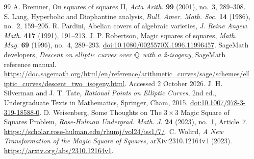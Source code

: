 \begin{thebibliography}{99}
 A. Bremner, On squares of squares II, \emph{Acta Arith.} \textbf{99} (2001), no.~3, 289--308.
 S. Lang, Hyperbolic and Diophantine analysis, \emph{Bull. Amer. Math. Soc.} \textbf{14} (1986), no.~2, 159--205.
 R. Pardini, Abelian covers of algebraic varieties, \emph{J. Reine Angew. Math.} \textbf{417} (1991), 191--213.
 J. P. Robertson, Magic squares of squares, \emph{Math. Mag.} \textbf{69} (1996), no.~4, 289--293. \href{https://doi.org/10.1080/0025570X.1996.11996457}{doi:10.1080/0025570X.1996.11996457}.
 SageMath developers, \emph{Descent on elliptic curves over $\mathbb Q$ with a 2-isogeny}, SageMath reference manual. \url{https://doc.sagemath.org/html/en/reference/arithmetic_curves/sage/schemes/elliptic_curves/descent_two_isogeny.html}. Accessed 2 October 2026.
 J. H. Silverman and J. T. Tate, \emph{Rational Points on Elliptic Curves}, 2nd ed., Undergraduate Texts in Mathematics, Springer, Cham, 2015. \href{https://doi.org/10.1007/978-3-319-18588-0}{doi:10.1007/978-3-319-18588-0}.
 D. Weisenberg, Some Thoughts on The $3\times3$ Magic Square of Squares Problem, \emph{Rose-Hulman Undergrad. Math. J.} \textbf{24} (2023), no.~1, Article~7. \url{https://scholar.rose-hulman.edu/rhumj/vol24/iss1/7/}.
 C. Wolird, \emph{A New Transformation of the Magic Square of Squares}, arXiv:2310.12164v1 (2023). \url{https://arxiv.org/abs/2310.12164v1}.
\end{thebibliography}
